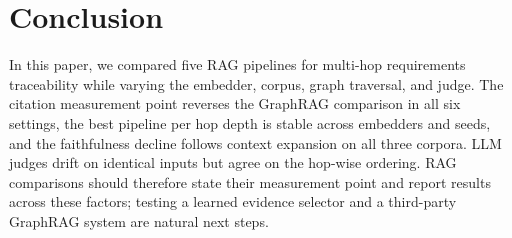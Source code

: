 \section{Conclusion}
\label{sec:conclusion}
In this paper, we compared five RAG pipelines for multi-hop
requirements traceability while varying the embedder, corpus, graph
traversal, and judge. The citation measurement point reverses the
GraphRAG comparison in all six settings, the best pipeline per hop
depth is stable across embedders and seeds, and the faithfulness
decline follows context expansion on all three corpora. LLM judges
drift on identical inputs but agree on the hop-wise ordering. RAG
comparisons should therefore state their measurement point and report
results across these factors; testing a learned evidence selector and a
third-party GraphRAG system are natural next steps.
